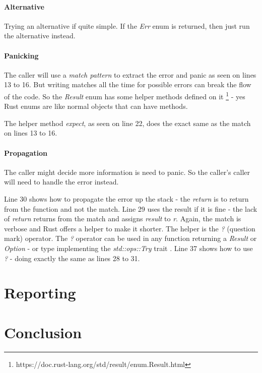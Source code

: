 \documentclass[a4paper,10pt]{article}
\begin{document}
\paragraph{Alternative}
Trying an alternative if quite simple.
If the \textit{Err} enum is returned, then just run the alternative instead.

\paragraph{Panicking}
The caller will use a \textit{match pattern} to extract the error and panic as seen on lines 13 to 16.
But writing matches all the time for possible errors can break the flow of the code.
So the \textit{Result} enum has some helper methods defined on it \footnote{https://doc.rust-lang.org/std/result/enum.Result.html} - yes Rust enums are like normal objects that can have methods.

The helper method \textit{expect}, as seen on line 22, does the exact same as the match on lines 13 to 16.

\paragraph{Propagation}
The caller might decide more information is need to panic.
So the caller's caller will need to handle the error instead.

Line 30 shows how to propagate the error up the stack - the \textit{return} is to return from the function and not the match.
Line 29 uses the result if it is fine - the lack of \textit{return} returns from the match and assigns \textit{result} to \textit{r}.
Again, the match is verbose and Rust offers a helper to make it shorter.
The helper is the \textit{?} (question mark) operator.
The \textit{?} operator can be used in any function returning a \textit{Result} or \textit{Option} - or type implementing the \textit{std::ops::Try} trait \cite{klabnik_2019_01}.
Line 37 shows how to use \textit{?} - doing exactly the same as lines 28 to 31.



\section{Reporting}

\section{Conclusion}




\end{document}
